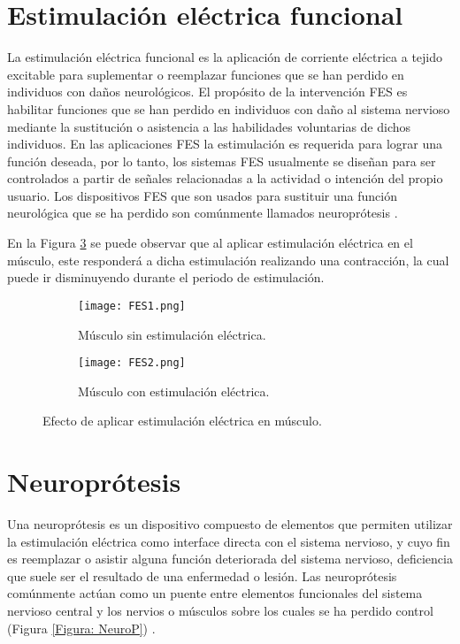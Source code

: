
\section{Estimulación eléctrica funcional}
La estimulación eléctrica funcional es la aplicación de corriente eléctrica a tejido excitable para suplementar o reemplazar funciones que se han perdido en individuos con daños neurológicos. El propósito de la intervención FES es habilitar funciones que se han perdido en individuos con daño al sistema nervioso mediante la sustitución o asistencia a las habilidades voluntarias de dichos individuos. En las aplicaciones FES la estimulación es requerida para lograr una función deseada, por lo tanto, los sistemas FES usualmente se diseñan para ser controlados a partir de señales relacionadas a la actividad o intención del propio usuario. Los dispositivos FES que son usados para sustituir una función neurológica que se ha perdido son comúnmente llamados neuroprótesis \cite{Peckham2005}.

En la Figura \ref{Figura: FES} se puede observar que al aplicar estimulación eléctrica en el músculo, este responderá a dicha estimulación realizando una contracción, la cual puede ir disminuyendo durante el periodo de estimulación.

\begin{figure}[htbp]
	\centering
	\begin{subfigure}[htbp]{0.4\textwidth}
		\centering
		\texttt{[image: FES1.png]}
		\caption{Músculo sin estimulación eléctrica.}
		\label{Figura: FES1}
	\end{subfigure}
	\hfill
	\begin{subfigure}[htbp]{0.4\textwidth}
		\centering
		\texttt{[image: FES2.png]}
		\caption{Músculo con estimulación eléctrica.}
		\label{Figura: FES2}
	\end{subfigure}
	\caption[Efecto de aplicar estimulación eléctrica en músculo]{Efecto de aplicar estimulación eléctrica en músculo.}
	\label{Figura: FES}
\end{figure}

\section{Neuroprótesis}
Una neuroprótesis es un dispositivo compuesto de elementos que permiten utilizar la estimulación eléctrica como interface directa con el sistema nervioso, y cuyo fin es reemplazar o asistir alguna función deteriorada del sistema nervioso, deficiencia que suele ser el resultado de una enfermedad o lesión. Las neuroprótesis comúnmente actúan como un puente entre elementos funcionales del sistema nervioso central y los nervios o músculos sobre los cuales se ha perdido control (Figura \ref{Figura: NeuroP}) \cite{Finn2003}\cite{Popovic2008}.

